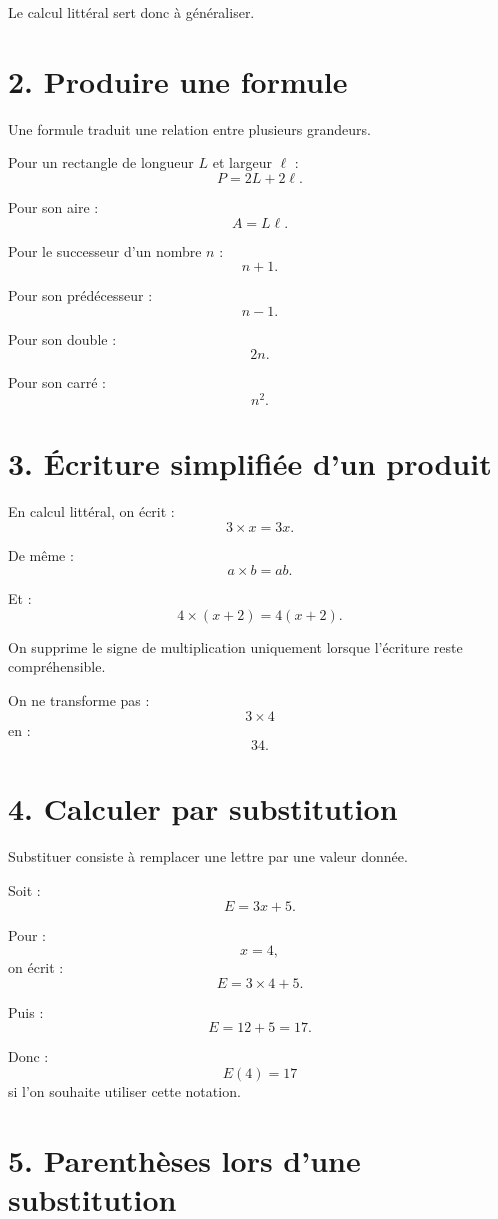 Le calcul littéral sert donc à généraliser.

\section{2. Produire une formule}

Une formule traduit une relation entre plusieurs grandeurs.

Pour un rectangle de longueur $L$ et largeur $\ell$ :
\[
P=2L+2\ell.
\]

Pour son aire :
\[
A=L\ell.
\]

Pour le successeur d'un nombre $n$ :
\[
n+1.
\]

Pour son prédécesseur :
\[
n-1.
\]

Pour son double :
\[
2n.
\]

Pour son carré :
\[
n^2.
\]

\section{3. Écriture simplifiée d'un produit}

En calcul littéral, on écrit :
\[
3\times x=3x.
\]

De même :
\[
a\times b=ab.
\]

Et :
\[
4\times(x+2)=4(x+2).
\]

\begin{attention}
On supprime le signe de multiplication uniquement lorsque l'écriture reste compréhensible.
\end{attention}

On ne transforme pas :
\[
3\times4
\]
en :
\[
34.
\]

\section{4. Calculer par substitution}

Substituer consiste à remplacer une lettre par une valeur donnée.

\begin{exemple}
Soit :
\[
E=3x+5.
\]

Pour :
\[
x=4,
\]
on écrit :
\[
E=3\times4+5.
\]

Puis :
\[
E=12+5=17.
\]

Donc :
\[
\boxed{E(4)=17}
\]
si l'on souhaite utiliser cette notation.
\end{exemple}

\section{5. Parenthèses lors d'une substitution}

